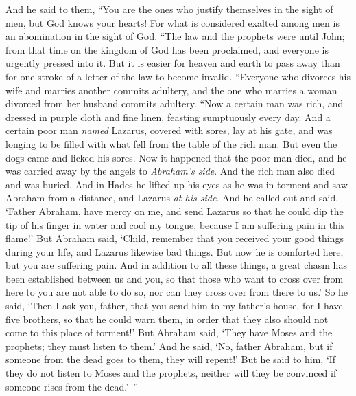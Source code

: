 \begin{biblechapter}
\verse And he said to them, “You are the ones who justify themselves in the sight of men, but God knows your hearts! For what is considered exalted among men is an abomination in the sight of God.
\verse “The law and the prophets were until John; from that time on the kingdom of God has been proclaimed, and everyone is urgently pressed into it.
\verse But it is easier for heaven and earth to pass away than for one stroke of a letter of the law to become invalid.
 “Everyone who divorces his wife and marries another commits adultery, and the one who marries a woman divorced from her husband commits adultery.
 “Now a certain man was rich, and dressed in purple cloth and fine linen, feasting sumptuously every day.
\verse And a certain poor man \textit{named} Lazarus, covered with sores, lay at his gate,
\verse and was longing to be filled with what fell from the table of the rich man. But even the dogs came and licked his sores.
\verse Now it happened that the poor man died, and he was carried away by the angels to \textit{Abraham’s side}. And the rich man also died and was buried.
\verse And in Hades he lifted up his eyes as he was in torment and saw Abraham from a distance, and Lazarus \textit{at his side}.
\verse And he called out and said, ‘Father Abraham, have mercy on me, and send Lazarus so that he could dip the tip of his finger in water and cool my tongue, because I am suffering pain in this flame!’
\verse But Abraham said, ‘Child, remember that you received your good things during your life, and Lazarus likewise bad things. But now he is comforted here, but you are suffering pain.
\verse And in addition to all these things, a great chasm has been established between us and you, so that those who want to cross over from here to you are not able to do so, nor can they cross over from there to us.’
\verse So he said, ‘Then I ask you, father, that you send him to my father’s house,
\verse for I have five brothers, so that he could warn them, in order that they also should not come to this place of torment!’
\verse But Abraham said, ‘They have Moses and the prophets; they must listen to them.’
\verse And he said, ‘No, father Abraham, but if someone from the dead goes to them, they will repent!’
\verse But he said to him, ‘If they do not listen to Moses and the prophets, neither will they be convinced if someone rises from the dead.’ ”
\end{biblechapter}

